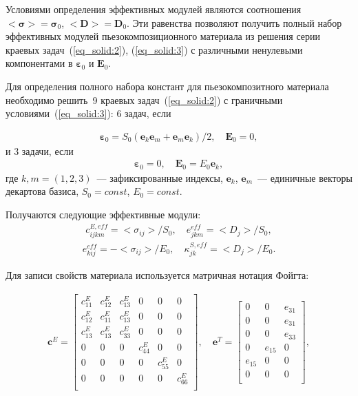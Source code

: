 Условиями определения эффективных модулей являются соотношения $<\boldsymbol{\sigma}>=\boldsymbol{\sigma}_0$, $<\boldsymbol{D}>=\boldsymbol{D}_0$. Эти равенства позволяют получить полный набор эффективных модулей пьезокомпозиционного материала из решения серии краевых задач~(\ref{eq_solid:2}), (\ref{eq_solid:3}) с различными ненулевыми компонентами в $\boldsymbol{\varepsilon}_0$ и $\boldsymbol{E}_0$.

Для определения полного набора констант для пьезокомпозитного материала необходимо решить~9 краевых задач~(\ref{eq_solid:2}) с граничными условиями~(\ref{eq_solid:3}): 6 задач, если 

\[
\begin{aligned}
\boldsymbol{\varepsilon}_0=S_0(\boldsymbol e_k \boldsymbol e_m+ \boldsymbol e_m \boldsymbol e_k)/2, \quad \boldsymbol{E}_0=0,
\end{aligned} 
\]
и 3 задачи, если
\[
\begin{aligned}
\boldsymbol{\varepsilon}_0=0, \quad \boldsymbol{E}_0=E_0\boldsymbol e_k,
\end{aligned} 
\]
где $k,m=(1,2,3)$~--- зафиксированные индексы, $\boldsymbol e_k$, $\boldsymbol e_m$~--- единичные векторы декартова базиса, $S_0=const$, $E_0=const$.

Получаются следующие эффективные модули:
\[
\begin{aligned}
c_{ijkm}^{E,eff}=<\sigma_{ij}>/S_0, \quad
e_{jkm}^{eff}=<D_j>/S_0,
\end{aligned} 
\]
\[
\begin{aligned}
e_{kij}^{eff}=-<\sigma_{ij}>/E_0, \quad
\kappa_{jk}^{S,eff}=<D_j>/E_0.
\end{aligned} 
\]

Для записи свойств материала используется матричная нотация Фойгта:

\[ 
\begin{aligned}
\boldsymbol{c}^E=
\begin{bmatrix}
	c_{11}^E & c_{12}^E & c_{13}^E & 0 & 0 & 0 \\ 
	c_{12}^E & c_{11}^E & c_{13}^E & 0 & 0 & 0 \\ 
	c_{13}^E & c_{13}^E & c_{33}^E & 0 & 0 & 0 \\ 
	0 & 0 & 0 & c_{44}^E & 0 & 0 \\
	0 & 0 & 0 & 0 & c_{55}^E & 0 \\
	0 & 0 & 0 & 0 & 0 & c_{66}^E\\
\end{bmatrix}, \quad
\boldsymbol{e}^T=
\begin{bmatrix}
	0 & 0 & e_{31} \\
	0 & 0 & e_{31} \\
	0 & 0 & e_{33} \\
	0 & e_{15} & 0 \\
	e_{15} & 0 & 0 \\
	0 & 0 & 0 \\
\end{bmatrix}, 
\end{aligned} 
\]

